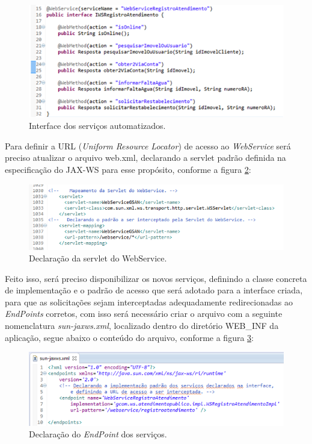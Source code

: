 \begin{figure}[!htb]
	\centering
	\caption{Interface dos serviços automatizados.}	
	\label{figura:interfaceServicosAutomatizados}
	\includegraphics{figuras/implementacao_servicos.png}
\end{figure}


Para definir a URL (\textit{Uniform Resource Locator}) de acesso ao \textit{WebService} será preciso atualizar o arquivo web.xml, declarando a servlet padrão definida na especificação do JAX-WS para esse propósito, conforme a figura \ref{figura:declaracaoServlet}:

\begin{figure}[!htb]
	\centering
	\caption{Declaração da servlet do WebService.}	
	\label{figura:declaracaoServlet}
	\includegraphics{figuras/declarando_servlet.png}
\end{figure}


Feito isso, será preciso disponibilizar os novos serviços, definindo a classe concreta de implementação e o padrão de acesso que será adotado para a interface criada, para que as solicitações sejam interceptadas adequadamente redirecionadas ao \textit{EndPoints} corretos, com isso será necessário criar o arquivo com a seguinte nomenclatura \textit{sun-jaxws.xml}, localizado dentro do diretório WEB\_INF da aplicação, segue abaixo o conteúdo do arquivo, conforme a figura \ref{figura:declaracaoEndPoint}:

\begin{figure}[!htb]
	\centering
	\caption{Declaração do \textit{EndPoint} dos serviços.}	
	\label{figura:declaracaoEndPoint}
	\includegraphics{figuras/declaracao_endpoint.png}
\end{figure}

